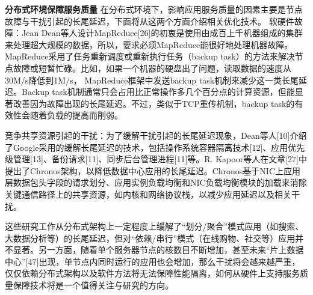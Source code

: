 \textbf{分布式环境保障服务质量}
在分布式环境下，影响应用服务质量的因素主要是节点故障与干扰引起的长尾延迟，下面将从这两个方面介绍相关优化技术。
软硬件故障：Jean Dean等人设计MapReduce[26]的初衷是使用由成百上千机器组成的集群来处理超大规模的数据，所以，要求必须MapReduce能很好地处理机器故障。MapReduce采用了任务重新调度或重新执行任务（backup task）的方法来解决节点故障或短暂忙碌。比如，如果一个机器的硬盘出了问题，读取数据的速度从30M/s降低到1M/s， MapReduce框架中发送backup task机制来减少这一类长尾延迟。Backup task机制通常只会占用比正常操作多几个百分点的计算资源，但能显著改善因为故障出现的长尾延迟。不过，类似于TCP重传机制，backup task的有效性会随着负载的提高而削弱。

竞争共享资源引起的干扰：为了缓解干扰引起的长尾延迟现象，Dean等人[10]介绍了Google采用的缓解长尾延迟的技术，包括操作系统容器隔离技术[12]、应用优先级管理[13]、备份请求[11]、同步后台管理进程[11]等。R. Kapoor等人在文章[27]中提出了Chronos架构，以降低数据中心应用的长尾延迟。Chronos基于NIC上应用层数据包头字段的请求划分、应用实例负载均衡和NIC负载均衡模块的加载来消除关键通信路径上的共享资源，如内核和网络协议栈，以减少应用延迟以及相关干扰。

这些研究工作从分布式架构上一定程度上缓解了``划分/聚合''模式应用（如搜索、大数据分析等）的长尾延迟，但对``依赖/串行''模式（在线购物、社交等）应用并不显著。另一方面，随着单个服务器节点的核数目不断增加，甚至未来``片上数据中心''[47]出现，单节点内同时运行的应用也会增加，那么干扰将会越来越严重，仅仅依赖分布式架构以及软件方法将无法保障性能隔离，如何从硬件上支持服务质量保障技术将是一个值得关注与研究的方向。

